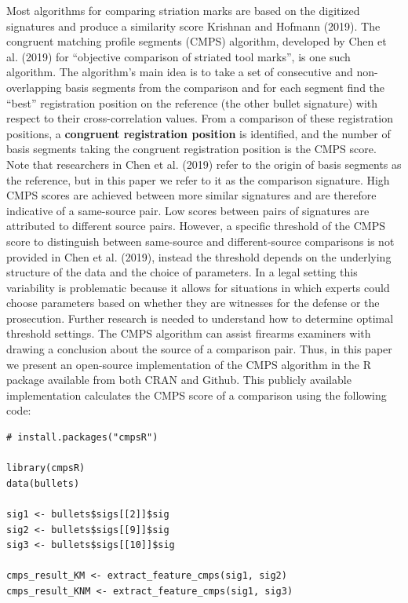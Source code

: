 Most algorithms for comparing striation marks are based on the digitized signatures and produce a similarity score Krishnan and Hofmann (2019).
The congruent matching profile segments (CMPS) algorithm, developed by Chen et al. (2019) for ``objective comparison of striated tool marks'', is one such algorithm.
The algorithm's main idea is to take a set of consecutive and non-overlapping basis segments from the comparison and for each segment find the ``best'' registration position on the reference (the other bullet signature) with respect to their cross-correlation values.
From a comparison of these registration positions, a \textbf{congruent registration position} is identified, and the number of basis segments taking the congruent registration position is the CMPS score.
Note that researchers in Chen et al. (2019) refer to the origin of basis segments as the reference, but in this paper we refer to it as the comparison signature.
High CMPS scores are achieved between more similar signatures and are therefore indicative of a same-source pair.
Low scores between pairs of signatures are attributed to different source pairs.
However, a specific threshold of the CMPS score to distinguish between same-source and different-source comparisons is not provided in Chen et al. (2019), instead the threshold depends on the underlying structure of the data and the choice of parameters. In a legal setting this variability is problematic because it allows for situations in which experts could choose parameters based on whether they are witnesses for the defense or the prosecution.
Further research is needed to understand how to determine optimal threshold settings.
The CMPS algorithm can assist firearms examiners with drawing a conclusion about the source of a comparison pair.
Thus, in this paper we present an open-source implementation of the CMPS algorithm in the R package  available from both CRAN and Github. This publicly available implementation calculates the CMPS score of a comparison using the following code:

\begin{verbatim}
# install.packages("cmpsR")

library(cmpsR)
data(bullets)

sig1 <- bullets$sigs[[2]]$sig
sig2 <- bullets$sigs[[9]]$sig
sig3 <- bullets$sigs[[10]]$sig

cmps_result_KM <- extract_feature_cmps(sig1, sig2)
cmps_result_KNM <- extract_feature_cmps(sig1, sig3)
\end{verbatim}

